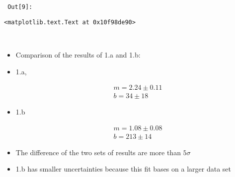 \documentclass{article}
\newlength{\inputpadding}
\newlength{\cellleftmargin}
\newlength{\smallerfontscale}
\def\smaller{\fontsize{\smallerfontscale}{\smallerfontscale}\selectfont}
\begin{document}
        {\par%
        \vspace{-1\smallerfontscale}%
        \noindent%
        \begin{minipage}{\cellleftmargin}%
    \hfill%
    {\smaller%
    \tt%
    \color{nbframe-out-prompt}%
    Out[9]:}%
    \hspace{\inputpadding}%
    \hspace{0em}%
    \hspace{3pt}%
    \end{minipage}%
        }%
    \begin{addmargin}[\cellleftmargin]{0em}%
    {\smaller%
    \vspace{-1\smallerfontscale}%
    
    
    
    \begin{verbatim}
<matplotlib.text.Text at 0x10f98de90>
    \end{verbatim}

    
}%
    \end{addmargin}%
    \begin{addmargin}[\cellleftmargin]{0em}%
    {\smaller%
    \vspace{-1\smallerfontscale}%
    
    \begin{center}
    \end{center}
    { \hspace*{\fill} \\}
    }%
    \end{addmargin}%
    \begin{itemize}
\itemsep1pt\parskip0pt
\item
  Comparison of the results of 1.a and 1.b:
\item
  1.a,

  \begin{align*}
  & m = 2.24\pm 0.11\\
  & b = 34 \pm 18 
  \end{align*}
\item
  1.b

  \begin{align*}
  & m = 1.08\pm 0.08\\
  & b = 213 \pm 14
  \end{align*}
\item
  The difference of the two sets of results are more than $5\sigma$
\item
  1.b has smaller uncertainties because this fit bases on a larger data
  set
\end{itemize}
\end{document}
